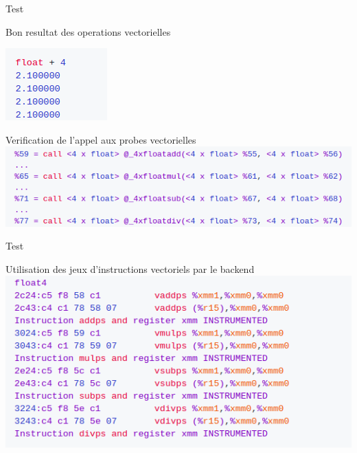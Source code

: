\documentclass{beamer}
\begin{document}
\begin{frame}{Test}

  \begin{block}{Bon resultat des operations vectorielles}
    

  \centering\includegraphics[scale=0.8]{../ressources/bon_resultat.png}

    
  \end{block}

  \begin{block}{Verification de l'appel aux probes vectorielles}
\centering\includegraphics[scale=0.5]{../ressources/appel_des_fonction.png}
  \end{block}
\end{frame}

\begin{frame}{Test}

\begin{block}{Utilisation des jeux d'instructions vectoriels par le backend}
\centering\includegraphics[scale=0.5]{../ressources/ajout_instructions.png}
  \end{block}
\end{frame}
\end{document}
